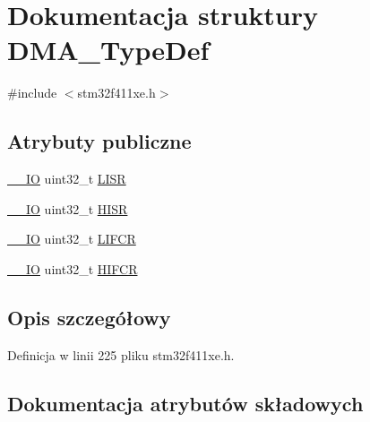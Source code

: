 \hypertarget{struct_d_m_a___type_def}{}\section{Dokumentacja struktury D\+M\+A\+\_\+\+Type\+Def}
\label{struct_d_m_a___type_def}


{\ttfamily \#include $<$stm32f411xe.\+h$>$}

\subsection*{Atrybuty publiczne}
\begin{DoxyCompactItemize}
\item 
\hyperlink{core__sc300_8h_aec43007d9998a0a0e01faede4133d6be}{\+\_\+\+\_\+\+IO} uint32\+\_\+t \hyperlink{struct_d_m_a___type_def_aacb4a0977d281bc809cb5974e178bc2b}{L\+I\+SR}
\item 
\hyperlink{core__sc300_8h_aec43007d9998a0a0e01faede4133d6be}{\+\_\+\+\_\+\+IO} uint32\+\_\+t \hyperlink{struct_d_m_a___type_def_a01a90a5fcd6459e10b81c0ab737dd2e3}{H\+I\+SR}
\item 
\hyperlink{core__sc300_8h_aec43007d9998a0a0e01faede4133d6be}{\+\_\+\+\_\+\+IO} uint32\+\_\+t \hyperlink{struct_d_m_a___type_def_a11adb689c874d38b49fa44990323b653}{L\+I\+F\+CR}
\item 
\hyperlink{core__sc300_8h_aec43007d9998a0a0e01faede4133d6be}{\+\_\+\+\_\+\+IO} uint32\+\_\+t \hyperlink{struct_d_m_a___type_def_a1e4f50b935bab2520788ae936f2e55c1}{H\+I\+F\+CR}
\end{DoxyCompactItemize}


\subsection{Opis szczegółowy}


Definicja w linii 225 pliku stm32f411xe.\+h.



\subsection{Dokumentacja atrybutów składowych}
\mbox{\label{struct_d_m_a___type_def_a1e4f50b935bab2520788ae936f2e55c1}} 
